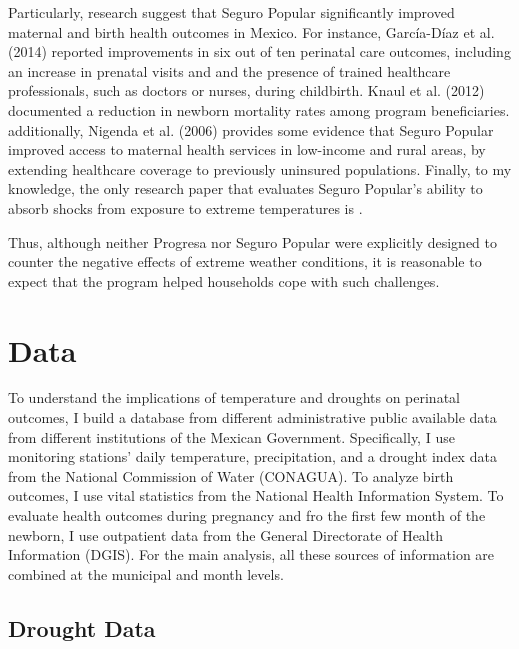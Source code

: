 \documentclass[12pt, oneside]{article}      %
\begin{document}
Particularly, research suggest that Seguro Popular significantly improved maternal and birth health outcomes in Mexico. For instance, García-Díaz et al. (2014) reported improvements in six out of ten perinatal care outcomes, including an increase in prenatal visits and and the presence of trained healthcare professionals, such as doctors or nurses, during childbirth. Knaul et al. (2012) documented a reduction in newborn mortality rates among program beneficiaries. 
additionally, Nigenda et al. (2006) provides some evidence that Seguro Popular improved access to maternal health services in low-income and rural areas, by extending healthcare coverage to previously uninsured populations. Finally, to my knowledge, the only research paper that evaluates Seguro Popular's ability to absorb shocks from exposure to extreme temperatures is \cite{Cohen2022}.

Thus, although neither Progresa nor Seguro Popular were explicitly designed to counter the negative effects of extreme weather conditions, it is reasonable to expect that the program helped households cope with such challenges.



\section{Data}

To understand the implications of temperature and droughts on perinatal outcomes, I build a database from different administrative public available data from different institutions of the Mexican Government. Specifically, I use monitoring stations' daily temperature, precipitation, and a drought index data from the National Commission of Water (CONAGUA). To analyze birth outcomes, I use vital statistics from the National Health Information System. To evaluate health outcomes during pregnancy and fro the first few month of the newborn, I use outpatient data from the General Directorate of Health Information (DGIS). For the main analysis, all these sources of information are combined at the municipal and month levels. 

\subsection{Drought Data}
\end{document}
